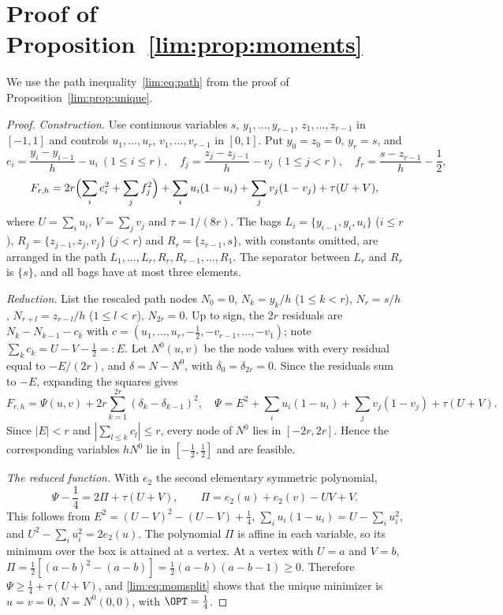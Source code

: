 \section{Proof of Proposition~\ref{lim:prop:moments}}\label{app:moments}
We use the path inequality~\eqref{lim:eq:path} from the proof of
Proposition~\ref{lim:prop:unique}.

\begin{proof}
\emph{Construction.} Use continuous variables $s$, $y_1,\ldots,y_{r-1}$,
$z_1,\ldots,z_{r-1}$ in $[-1,1]$ and controls $u_1,\ldots,u_r$,
$v_1,\ldots,v_{r-1}$ in $[0,1]$. Put $y_0=z_0=0$, $y_r=s$, and
\[
e_i=\frac{y_i-y_{i-1}}h-u_i\ (1\le i\le r),\quad
f_j=\frac{z_j-z_{j-1}}h-v_j\ (1\le j<r),\quad
f_r=\frac{s-z_{r-1}}h-\frac12,
\]
\[
F_{r,h}=2r\Bigl(\sum_ie_i^2+\sum_jf_j^2\Bigr)+\sum_iu_i(1-u_i)
+\sum_jv_j(1-v_j)+\tau(U+V),
\]
where $U=\sum_iu_i$, $V=\sum_jv_j$ and $\tau=1/(8r)$. The bags
$L_i=\{y_{i-1},y_i,u_i\}$ ($i\le r$), $R_j=\{z_{j-1},z_j,v_j\}$ ($j<r$) and
$R_r=\{z_{r-1},s\}$, with constants omitted, are arranged in the path
$L_1,\ldots,L_r,R_r,R_{r-1},\ldots,R_1$. The separator between $L_r$ and
$R_r$ is $\{s\}$, and all bags have at most three elements.

\emph{Reduction.} List the rescaled path nodes $N_0=0$, $N_k=y_k/h$
($1\le k<r$), $N_r=s/h$, $N_{r+l}=z_{r-l}/h$ ($1\le l<r$), $N_{2r}=0$. Up to
sign, the $2r$ residuals are $N_k-N_{k-1}-c_k$ with
$c=(u_1,\ldots,u_r,-\frac12,-v_{r-1},\ldots,-v_1)$; note
$\sum_kc_k=U-V-\frac12=:E$. Let $N^0(u,v)$ be the node values with every
residual equal to $-E/(2r)$, and $\delta=N-N^0$, with $\delta_0=\delta_{2r}=0$.
Since the residuals sum to $-E$, expanding the squares gives
\begin{equation}\label{lim:eq:momsplit}
F_{r,h}=\Psi(u,v)+2r\sum_{k=1}^{2r}(\delta_k-\delta_{k-1})^2,\quad
\Psi=E^2+\sum_iu_i(1-u_i)+\sum_jv_j(1-v_j)+\tau(U+V).
\end{equation}
Since $|E|<r$ and $|\sum_{l\le k}c_l|\le r$, every node of $N^0$ lies in
$[-2r,2r]$. Hence the corresponding variables $hN^0$ lie in
$[-\tfrac12,\tfrac12]$ and are feasible.

\emph{The reduced function.} With $e_2$ the second elementary symmetric
polynomial,
\begin{equation}\label{lim:eq:pi}
\Psi-\frac14=2\Pi+\tau(U+V),\qquad\Pi=e_2(u)+e_2(v)-UV+V .
\end{equation}
This follows from $E^2=(U-V)^2-(U-V)+\frac14$, $\sum_iu_i(1-u_i)=U-\sum_iu_i^2$,
and $U^2-\sum_iu_i^2=2e_2(u)$. The polynomial $\Pi$ is affine in each
variable, so its minimum over the box is attained at a vertex. At a vertex
with $U=a$ and $V=b$,
$\Pi=\frac12[(a-b)^2-(a-b)]=\frac12(a-b)(a-b-1)\ge0$. Therefore $\Psi\ge
\frac14+\tau(U+V)$, and \eqref{lim:eq:momsplit} shows that the unique
minimizer is $u=v=0$, $N=N^0(0,0)$, with $\OPT=\frac14$.


\end{proof}
